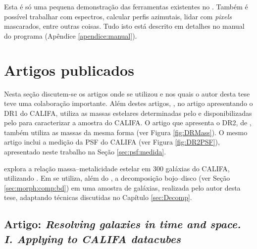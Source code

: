 Esta é só uma pequena demonstração das ferramentas existentes no \pycasso. Também
é possível trabalhar com espectros, calcular perfis azimutais, lidar com {\em
pixels} mascarados, entre outras coisas. Tudo isto está descrito em detalhes no
manual do programa (Apêndice \ref{apendice:manual}).



\section{Artigos publicados}
\label{sec:pycasso:art}

Nesta seção discutem-se os artigos onde se utilizou \pycasso e nos quais o autor
desta tese teve uma colaboração importante. Além destes artigos,
\citet{Husemann2013}, no artigo apresentando o DR1 do CALIFA, utiliza as massas
estelares determinadas pelo \starlight e disponibilizadas pelo \pycasso para
caracterizar a amostra do CALIFA. O artigo que apresenta o DR2, de
\citet{GarciaBenito2015}, também utiliza as massas da mesma forma (ver Figura
\ref{fig:DRMass}). O mesmo artigo inclui a medição da PSF do CALIFA (ver Figura
\ref{fig:DR2PSF}), apresentado neste trabalho na Seção \ref{sec:psf:medida}.

\citet{GonzalezDelgado2014b} explora a relação massa--metalicidade estelar em
300 galáxias do CALIFA, utilizando \pycasso. Em \citet{GonzalezDelgado2015} se
utiliza, além do \pycasso, a decomposição bojo--disco (ver Seção
\ref{sec:morph:comp:bd}) em uma amostra de galáxias, realizada pelo autor desta
tese, adaptando técnicas discutidas no Capítulo \ref{sec:Decomp}.



\subsection{Artigo: {\em Resolving galaxies in time and space. I. Applying
\starlight to CALIFA datacubes}}
\label{sec:pycasso:art:Resolving1}

